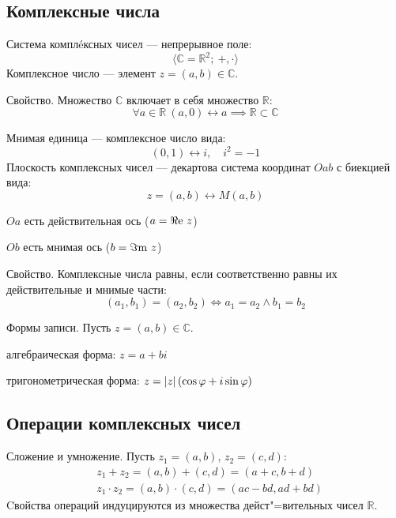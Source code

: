 \newpage
\subsection{Комплексные числа}

{\bold Система комплéксных чисел} --- непрерывное поле:
$$\langle\mathbb{C}=\mathbb{R}^2;\ +,\cdot\rangle$$
{\bold Комплексное число} --- элемент $z=(a,b)\in\mathbb{C}$.
\begin{theorem}
{\bold Свойство.} Множество $\mathbb{C}$ включает в себя множество $\mathbb{R}$:
$$\forall a\in\mathbb{R}\ (a,0)\leftrightarrow a\implies\mathbb{R}\subset\mathbb{C}$$
\end{theorem}
{\bold Мнимая единица} --- комплексное число вида:
$$(0,1)\leftrightarrow i,\quad i^2=-1$$
{\bold Плоскость комплексных чисел} --- декартова система координат $Oab$ с биекцией вида:
$$z=(a,b)\leftrightarrow M(a,b)$$

\begin{list*}
\item $Oa$ есть действительная ось {\ital\color{desc}($a=\Re\text{e}\ z$)}
\item $Ob$ есть мнимая ось {\ital\color{desc}($b=\Im\text{m}\ z$)}
\end{list*}
\begin{theorem}
{\bold Свойство.} Комплексные числа {\ital равны}, если соответственно равны их действительные и мнимые части:
$$(a_1,b_1)=(a_2,b_2)\iff a_1=a_2\land b_1=b_2$$
\end{theorem}
\begin{theorem}
{\bold Формы записи.} Пусть $z=(a,b)\in\mathbb{C}$.
\begin{list*}
\item алгебраическая форма: $z=a+bi$
\item тригонометрическая форма: $z=\abs{z}(\cos\varphi+i\sin\varphi)$
\end{list*}
\end{theorem}

\subsection{Операции комплексных чисел}

\begin{theorem}
{\bold Сложение и умножение.} Пусть $z_1=(a,b)$, $z_2=(c,d)$:
$$\begin{aligned}
&z_1+z_2=(a,b)+(c,d)=(a+c,b+d)\\
&z_1\cdot z_2=(a,b)\cdot(c,d)=(ac-bd,ad+bd)
\end{aligned}$$
Cвойства операций {\ital индуцируются} из множества дейст"=вительных чисел $\mathbb{R}$. 
\end{theorem}

